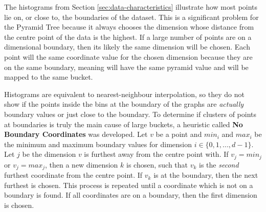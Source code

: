 The histograms from Section \ref{sec:data-characteristics} illustrate how most points lie on, or close to, the boundaries of the dataset. This is a significant problem for the Pyramid Tree because it always chooses the dimension whose distance from the centre point of the data is the highest. If a large number of points are on a dimensional boundary, then its likely the same dimension will be chosen. Each point will the same coordinate value for the chosen dimension because they are on the same boundary, meaning will have the same pyramid value and will be mapped to the same bucket.

\begin{table}
	\centering
	\caption{Pyramid Tree Bucket Size Statistics with Different Dimensions of Astrophysics Dataset}
	\label{tab:final-bucket-size}
\end{table}

Histograms are equivalent to nearest-neighbour interpolation, so they do not show if the points inside the bins at the boundary of the graphs are \textit{actually} boundary values or just close to the boundary. To determine if clusters of points at boundaries is truly the main cause of large buckets, a heuristic called \textbf{No Boundary Coordinates} was developed. Let $v$ be a point and $min_i$ and $max_i$ be the minimum and maximum boundary values for dimension $i \in \lbrace 0, 1, ..., d - 1 \rbrace$. Let $j$ be the dimension $v$ is furthest away from the centre point with. If $v_j = min_j$ or $v_j = max_j$, then a new dimension $k$ is chosen, such that $v_k$ is the \textit{second} furthest coordinate from the centre point. If $v_k$ is at the boundary, then the next furthest is chosen. This process is repeated until a coordinate which is not on a boundary is found. If all coordinates are on a boundary, then the first dimension is chosen.

